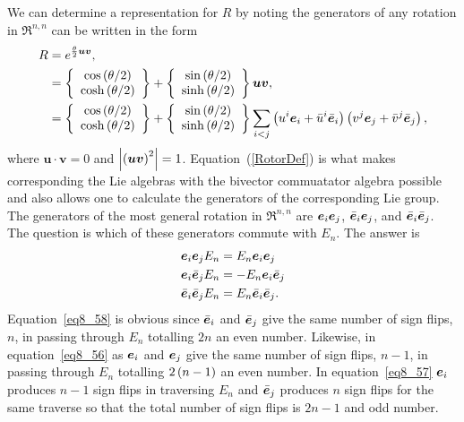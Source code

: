 We can determine a representation for $R$ by noting the generators of any rotation in $\Re^{n,n}$ can
be written in the form
\begin{align}
	R &= e^{\frac{\theta}{2} \bm{u}\bm{v}}, \nonumber \\
      &= \left \{\begin{array}{c}{{\cos}\left ({\theta/2} \right )}\\{{\cosh}\left ( {\theta/2} \right )}\end{array}\right \}
	    +\left \{\begin{array}{c}{{\sin}\left ({\theta/2} \right )}\\{{\sinh}\left ( {\theta/2} \right )}\end{array}\right \}\bm{u}\bm{v}, \nonumber \\	  
	  &=\left \{\begin{array}{c}{{\cos}\left ({\theta/2} \right )}\\{{\cosh}\left ( {\theta/2} \right )}\end{array}\right \}
	    +\left \{\begin{array}{c}{{\sin}\left ({\theta/2} \right )}\\{{\sinh}\left ( {\theta/2} \right )}\end{array}\right \}\sum_{i<j}\left ( {u^{i}\bm{e}_{i}+\bar{u}^{i}\bar{\bm{e}}_{i}} \right )
	    \left ( {v^{j}\bm{e}_{j}+\bar{v}^{j}\bar{\bm{e}}_{j}} \right ), \label{RotorDef}
\end{align}
where $\bm{u}\cdot\bm{v}= 0$ and $\left | {\left ( {\bm{u}\bm{v}} \right )^{2}} \right |=1$.  Equation~(\ref{RotorDef}) is what makes corresponding
the Lie algebras with the bivector commuatator algebra possible and also allows one to calculate the generators of the
corresponding Lie group.  
The generators of the most general rotation in $\Re^{n,n}$ are $\bm{e}_{i}\bm{e}_{j}$, $\bar{\bm{e}}_{i}\bm{e}_{j}$, and $\bar{\bm{e}}_{i}\bar{\bm{e}}_{j}$.  The question is which of these generators commute with $E_{n}$. The answer is
\begin{align}
	\bm{e}_{i}\bm{e}_{j}E_{n} &= E_{n}\bm{e}_{i}\bm{e}_{j} \label{eq8_56}\\
	\bm{e}_{i}\bar{\bm{e}}_{j}E_{n} &= -E_{n}\bm{e}_{i}\bar{\bm{e}}_{j} \label{eq8_57}\\
	\bar{\bm{e}}_{i}\bar{\bm{e}}_{j}E_{n} &= E_{n}\bar{\bm{e}}_{i}\bar{\bm{e}}_{j}.\label{eq8_58}
\end{align}
Equation~\ref{eq8_58} is obvious since $\bar{\bm{e}}_{i}$ and $\bar{\bm{e}}_{j}$ give the same number of
sign flips, $n$, in passing through $E_{n}$ totalling $2n$ an even number. Likewise, 
in equation~\ref{eq8_56} as $\bm{e}_{i}$ and $\bm{e}_{j}$ give the same number of sign flips, $n-1$, in passing through $E_{n}$ totalling $2\left ( {n-1} \right )$ an even number.  In equation~\ref{eq8_57} $\bm{e}_{i}$ produces $n-1$ sign flips
in traversing $E_{n}$ and $\bar{\bm{e}}_{j}$ produces $n$ sign flips for the same traverse so that the total
number of sign flips is $2n-1$ and odd number.

